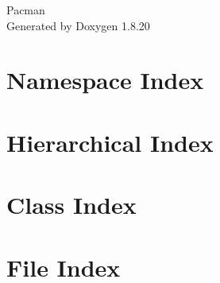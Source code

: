 \let\mypdfximage\pdfximage\def\pdfximage{\immediate\mypdfximage}\documentclass[twoside]{book}
\newcommand{\+}{\discretionary{\mbox{\scriptsize$\hookleftarrow$}}{}{}}
\newcommand{\clearemptydoublepage}{%
  \newpage{\pagestyle{empty}\cleardoublepage}%
}
\begin{document}
\hypersetup{pageanchor=false,
             bookmarksnumbered=true,
             pdfencoding=unicode
            }
\begin{titlepage}
\vspace*{7cm}
\begin{center}%
{\Large Pacman }\\
\vspace*{1cm}
{\large Generated by Doxygen 1.8.20}\\
\end{center}
\end{titlepage}
\clearemptydoublepage
{}
\tableofcontents
\clearemptydoublepage
{}
\hypersetup{pageanchor=true}

\chapter{Namespace Index}

\chapter{Hierarchical Index}

\chapter{Class Index}

\chapter{File Index}

\end{document}
